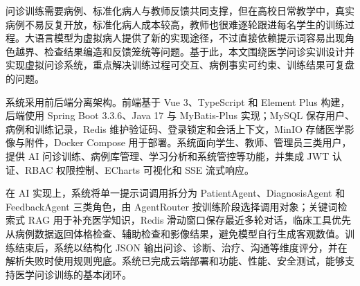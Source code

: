 
\begin{abstractzh}

问诊训练需要病例、标准化病人与教师反馈共同支撑，但在高校日常教学中，真实病例不易反复开放，标准化病人成本较高，教师也很难逐轮跟进每名学生的训练过程。大语言模型为虚拟病人提供了新的实现途径，不过直接依赖提示词容易出现角色越界、检查结果编造和反馈笼统等问题。基于此，本文围绕医学问诊实训设计并实现虚拟问诊系统，重点解决训练过程可交互、病例事实可约束、训练结果可复盘的问题。

系统采用前后端分离架构。前端基于 Vue 3、TypeScript 和 Element Plus 构建，后端使用 Spring Boot 3.3.6、Java 17 与 MyBatis-Plus 实现；MySQL 保存用户、病例和训练记录，Redis 维护验证码、登录锁定和会话上下文，MinIO 存储医学影像与附件，Docker Compose 用于部署。系统面向学生、教师、管理员三类用户，提供 AI 问诊训练、病例库管理、学习分析和系统管控等功能，并集成 JWT 认证、RBAC 权限控制、ECharts 可视化和 SSE 流式响应。

在 AI 实现上，系统将单一提示词调用拆分为 PatientAgent、DiagnosisAgent 和 FeedbackAgent 三类角色，由 AgentRouter 按训练阶段选择调用对象；关键词检索式 RAG 用于补充医学知识，Redis 滑动窗口保存最近多轮对话，临床工具优先从病例数据返回体格检查、辅助检查和影像结果，避免模型自行生成客观数值。训练结束后，系统以结构化 JSON 输出问诊、诊断、治疗、沟通等维度评分，并在解析失败时使用规则兜底。系统已完成云端部署和功能、性能、安全测试，能够支持医学问诊训练的基本闭环。


\end{abstractzh}
